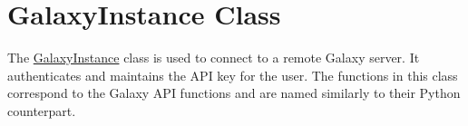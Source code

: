 \hypertarget{group__galaxy__instance__class}{}\section{Galaxy\+Instance Class}
\label{group__galaxy__instance__class}
The \hyperlink{classGalaxyInstance}{Galaxy\+Instance} class is used to connect to a remote Galaxy server. It authenticates and maintains the A\+PI key for the user. The functions in this class correspond to the Galaxy A\+PI functions and are named similarly to their Python counterpart. 